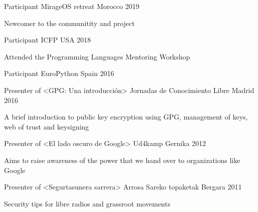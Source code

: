 \documentclass[11pt, a4paper]{awesome-cv}
\begin{document}

\begin{cventries}
    \cventry
      {Participant} %
      {MirageOS retreat} %
      {Morocco} %
      {2019} %
      {
        \begin{cvitems}
            \item Newcomer to the communitity and project
        \end{cvitems}
      }

    \cventry
      {Participant} %
      {ICFP} %
      {USA} %
      {2018} %
      {
        \begin{cvitems}
            \item Attended the Programming Languages Mentoring Workshop
        \end{cvitems}
      }

    \cventry
      {Participant} %
      {EuroPython} %
      {Spain} %
      {2016} %
      {}

    \cventry
      {Presenter of <GPG: Una introducción>} %
      {Jornadas de Conocimiento Libre} %
      {Madrid} %
      {2016} %
      {
        \begin{cvitems} %
          \item {A brief introduction to public key encryption using GPG,
              management of keys, web of trust and keysigning}
        \end{cvitems}
      }

    \cventry
      {Presenter of <El lado oscuro de Google>} %
      {Ud4kamp} %
      {Gernika} %
      {2012} %
      {
        \begin{cvitems} %
          \item {Aims to raise awareness of the power that we hand over to
              organizations like Google}
        \end{cvitems}
      }
  
    \cventry
      {Presenter of <Segurtasunera sarrera>} %
      {Arrosa Sareko topaketak} %
      {Bergara} %
      {2011} %
      {
        \begin{cvitems} %
          \item {Security tips for libre radios and grassroot movements}
        \end{cvitems}
      }
  

\end{cventries}
\end{document}
